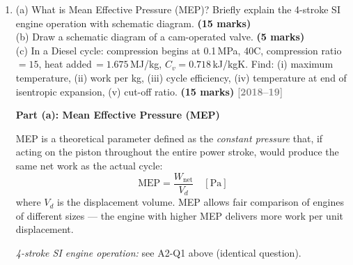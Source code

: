 \documentclass[12pt,a3paper]{article}
\newcommand{\yr}[1]{\hfill\textcolor{gray}{\small\textbf{[#1]}}}
\newcommand{\mk}[1]{\textcolor{orange!70!black}{\small\textbf{(#1 marks)}}}
\begin{document}
\begin{enumerate}
\begin{tcolorbox}[enhanced,breakable,ansbox,colback=cB!4,colframe=cB,
  boxrule=0.8pt,arc=5pt,
  title={\textbf{Answer}},fonttitle=\bfseries\color{white},colbacktitle=cB]
\textbf{Displacement per cylinder:}
\[
  V_{s,1} = \frac{4000}{8} = 500\,\text{cm}^3
\]

\textbf{Cylinder bore:}
\[
  V_{s,1} = \frac{\pi}{4}B^3 \implies
  B = \left(\frac{4\times500}{\pi}\right)^{1/3}
  = \left(\frac{2000}{\pi}\right)^{1/3}
  \approx 8.603\,\text{cm} = \boxed{86.03\,\text{mm}}
\]

\textbf{Stroke length:} $L = B \approx \boxed{86.03\,\text{mm}}$ (square engine)

\textbf{Average piston speed:}
\[
  \bar{U}_p = 2LN = 2\times0.08603\times\frac{4000}{60}
  \approx \boxed{11.47\,\text{m/s}}
\]

\textbf{Clearance volume per cylinder:}
\[
  V_c = \frac{V_{s,1}}{r-1} = \frac{500}{9}
  \approx \boxed{55.56\,\text{cm}^3}
\]

\end{tcolorbox}

\item \label{qlabel:A2-Q14}
(a) What is Mean Effective Pressure (MEP)? Briefly explain the 4-stroke SI engine operation with schematic diagram. \mk{15}\\
(b) Draw a schematic diagram of a cam-operated valve. \mk{5}\\
(c) In a Diesel cycle: compression begins at 0.1\,MPa, 40\textdegree C, compression ratio\,$= 15$, heat added\,$= 1.675$\,MJ/kg, $C_v = 0.718$\,kJ/kgK. Find: (i) maximum temperature, (ii) work per kg, (iii) cycle efficiency, (iv) temperature at end of isentropic expansion, (v) cut-off ratio. \mk{15}
\yr{2018--19}

\begin{tcolorbox}[enhanced,breakable,ansbox,colback=cB!4,colframe=cB,
  boxrule=0.8pt,arc=5pt,
  title={\textbf{Answer}},fonttitle=\bfseries\color{white},colbacktitle=cB]

\textbf{Part (a): Mean Effective Pressure (MEP)}

MEP is a theoretical parameter defined as the \emph{constant pressure} that, if
acting on the piston throughout the entire power stroke, would produce the same
net work as the actual cycle:
\[
  \text{MEP} = \frac{W_{\text{net}}}{V_d} \quad [\text{Pa}]
\]
where $V_d$ is the displacement volume. MEP allows fair comparison of engines
of different sizes — the engine with higher MEP delivers more work per unit
displacement.

\textit{4-stroke SI engine operation:} see A2-Q1 above (identical question).


\end{tcolorbox}
\end{enumerate}
\end{document}
